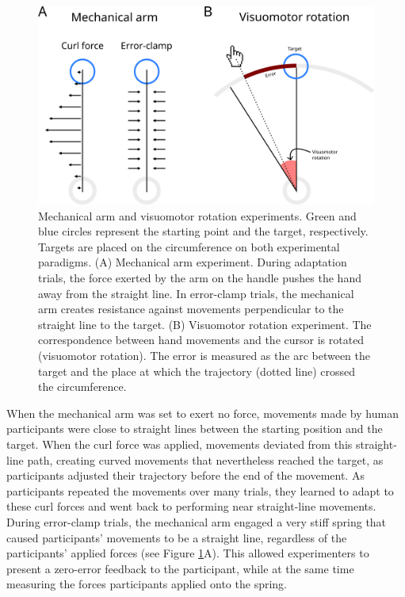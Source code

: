 \documentclass[a4paper,doc,floatsintext,natbib]{apa6}
\def \fref #1{Figure \ref{#1}}     %
\begin{document}
\begin{figure}
\centering
\includegraphics[]{./figures/experiments.png}
\caption{Mechanical arm and visuomotor rotation experiments. Green and blue circles represent the starting point and the target, respectively. Targets are placed on the circumference on both experimental paradigms. (A) Mechanical arm experiment. During adaptation trials, the force exerted by the arm on the handle pushes the hand away from the straight line. In error-clamp trials, the mechanical arm creates resistance against movements perpendicular to the straight line to the target. (B) Visuomotor rotation experiment. The correspondence between hand movements and the cursor is rotated (visuomotor rotation). The error is measured as the arc between the target and the place at which the trajectory (dotted line) crossed the circumference.}
\label{fig:experiments}
\end{figure}

When the mechanical arm was set to exert no force, movements made by human participants were close to straight lines between the starting position and the target. When the curl force was applied, movements deviated from this straight-line path, creating curved movements that nevertheless reached the target, as participants adjusted their trajectory before the end of the movement. As participants repeated the movements over many trials, they learned to adapt to these curl forces and went back to performing near straight-line movements. During error-clamp trials, the mechanical arm engaged a very stiff spring that caused participants' movements to be a straight line, regardless of the participants' applied forces (see \fref{fig:experiments}A). This allowed experimenters to present a zero-error feedback to the participant, while at the same time measuring the forces participants applied onto the spring.
\end{document}
